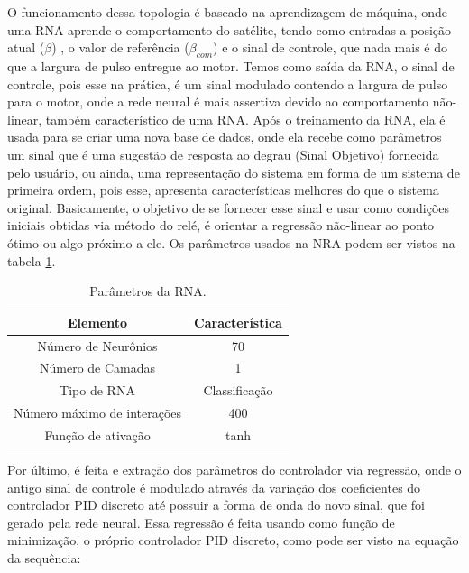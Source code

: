 O funcionamento dessa topologia é baseado na aprendizagem de máquina, onde uma RNA aprende o comportamento do satélite, tendo como entradas a posição atual ($\beta$) , o valor de referência ($\beta_{com}$) e o sinal de controle, que nada mais é do que a largura de pulso entregue ao motor. Temos como saída da RNA, o sinal de controle, pois esse na prática, é um sinal modulado contendo a largura de pulso para o motor, onde a rede neural é mais assertiva devido ao comportamento não-linear, também característico de uma RNA. Após o treinamento da RNA, ela é usada para se criar uma nova base de dados, onde ela recebe como parâmetros um sinal que é uma sugestão de resposta ao degrau (Sinal Objetivo) fornecida pelo usuário, ou ainda, uma representação do sistema em forma de um sistema de primeira ordem, pois esse, apresenta características melhores do que o sistema original. Basicamente, o objetivo de se fornecer esse sinal e usar como condições iniciais obtidas via método do relé, é orientar a regressão não-linear ao ponto ótimo ou algo próximo a ele. Os parâmetros usados na NRA podem ser vistos na tabela \ref{tab:rna}.

\begin{table}[H]
  \caption{Parâmetros da RNA.}
  \label{tab:rna}
  \centering%
  \begin{minipage}{.55\textwidth}
    \begin{tabular*}{\textwidth}{cc}
      \hline
      Elemento & Característica \\ \hline
      \hline
      Número de Neurônios          & 70 \\ 
      Número de Camadas            & 1 \\
      Tipo de RNA                  & Classificação \\
      Número máximo de interações  & 400 \\
      Função de ativação           & tanh \\ \hline
    \end{tabular*}
  \end{minipage}
\end{table}

Por último, é feita e extração dos parâmetros do controlador via regressão, onde o antigo sinal de controle é modulado através da variação dos coeficientes do controlador PID discreto até possuir a forma de onda do novo sinal, que foi gerado pela rede neural. Essa regressão é feita usando como função de minimização, o próprio controlador PID discreto, como pode ser visto na equação da sequência:

